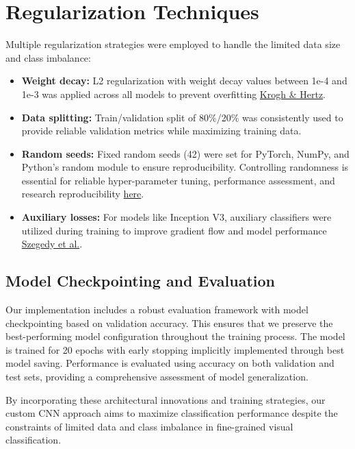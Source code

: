 \documentclass[a4paper,12pt]{article}
\begin{document}
\section{Regularization Techniques}
Multiple regularization strategies were employed to handle the limited data size and class imbalance:
\begin{itemize}
\item \textbf{Weight decay:} L2 regularization with weight decay values between 1e-4 and 1e-3 was applied across all models to prevent overfitting \href{https://papers.nips.cc/paper/1991/file/8eefcfdf5990e441f0fb6f3fad709e21-Paper.pdf}{Krogh & Hertz}.
\item \textbf{Data splitting:} Train/validation split of 80\%/20\% was consistently used to provide reliable validation metrics while maximizing training data.
\item \textbf{Random seeds:} Fixed random seeds (42) were set for PyTorch, NumPy, and Python's random module to ensure reproducibility. Controlling randomness is essential for reliable hyper-parameter tuning, performance assessment, and research reproducibility \href{https://ieeexplore.ieee.org/stamp/stamp.jsp?tp=&arnumber=10533638&tag=}{here}.
\item \textbf{Auxiliary losses:} For models like Inception V3, auxiliary classifiers were utilized during training to improve gradient flow and model performance \href{https://arxiv.org/abs/1512.00567}{Szegedy et al.}.
\end{itemize}

\subsection{Model Checkpointing and Evaluation}

Our implementation includes a robust evaluation framework with model checkpointing based on validation accuracy. This ensures that we preserve the best-performing model configuration throughout the training process. The model is trained for 20 epochs with early stopping implicitly implemented through best model saving. Performance is evaluated using accuracy on both validation and test sets, providing a comprehensive assessment of model generalization.

By incorporating these architectural innovations and training strategies, our custom CNN approach aims to maximize classification performance despite the constraints of limited data and class imbalance in fine-grained visual classification.
\end{document}
